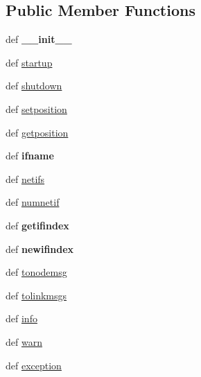 \subsection*{Public Member Functions}
\begin{DoxyCompactItemize}
\item 
\hypertarget{classcore_1_1coreobj_1_1_py_core_obj_ab468fd0c84212a4ea4fdb0e28358676a}{def {\bfseries \+\_\+\+\_\+init\+\_\+\+\_\+}}\label{classcore_1_1coreobj_1_1_py_core_obj_ab468fd0c84212a4ea4fdb0e28358676a}

\item 
def \hyperlink{classcore_1_1coreobj_1_1_py_core_obj_a5f7575c2b17e037c9f3ab83bcdf38e71}{startup}
\item 
def \hyperlink{classcore_1_1coreobj_1_1_py_core_obj_ae1a52762cf7019940b12740f63e535c6}{shutdown}
\item 
def \hyperlink{classcore_1_1coreobj_1_1_py_core_obj_aacd37e93a00385c5943c5e30f13d7f83}{setposition}
\item 
def \hyperlink{classcore_1_1coreobj_1_1_py_core_obj_acdb52267b840c66b7a7bfa29536971ba}{getposition}
\item 
\hypertarget{classcore_1_1coreobj_1_1_py_core_obj_a5997b1f039ffebae781848f97a280cfe}{def {\bfseries ifname}}\label{classcore_1_1coreobj_1_1_py_core_obj_a5997b1f039ffebae781848f97a280cfe}

\item 
def \hyperlink{classcore_1_1coreobj_1_1_py_core_obj_ac76edfbaa73e6d834c7adc0a8f7ff057}{netifs}
\item 
def \hyperlink{classcore_1_1coreobj_1_1_py_core_obj_ac89f343f4fe09cc7411c686fd283e3c8}{numnetif}
\item 
\hypertarget{classcore_1_1coreobj_1_1_py_core_obj_a858438b1f6362bda8bfd415f6f6fe3a0}{def {\bfseries getifindex}}\label{classcore_1_1coreobj_1_1_py_core_obj_a858438b1f6362bda8bfd415f6f6fe3a0}

\item 
\hypertarget{classcore_1_1coreobj_1_1_py_core_obj_a7014187bd4e99000f059f362574bf4ac}{def {\bfseries newifindex}}\label{classcore_1_1coreobj_1_1_py_core_obj_a7014187bd4e99000f059f362574bf4ac}

\item 
def \hyperlink{classcore_1_1coreobj_1_1_py_core_obj_a831cdd437b182aa0331036a300895831}{tonodemsg}
\item 
def \hyperlink{classcore_1_1coreobj_1_1_py_core_obj_afc143ebecfa4fde16265b0012267836b}{tolinkmsgs}
\item 
def \hyperlink{classcore_1_1coreobj_1_1_py_core_obj_ab5de7c83a4beb409b949f22ddbe712b9}{info}
\item 
def \hyperlink{classcore_1_1coreobj_1_1_py_core_obj_ad2f6a727890d7844ac83e22b35360935}{warn}
\item 
def \hyperlink{classcore_1_1coreobj_1_1_py_core_obj_a10002ce6fc412fcb36e1d5206ae26c48}{exception}
\end{DoxyCompactItemize}

